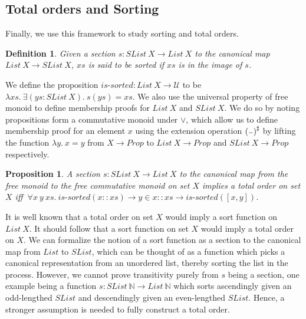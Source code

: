 \documentclass{article}
\begin{document}
\subsection*{Total orders and Sorting}

\newtheorem{myconj}{Conjecture}
\newtheorem{mydef}{Definition}
\newtheorem{mylemma}{Lemma}
\newtheorem{mythm}{Proposition}

Finally, we use this framework to study sorting and total orders.

\begin{mydef}
    Given a section $s : SList \: X \rightarrow List \: X$ to the canonical map $List \: X \rightarrow SList \: X$,
    $xs$ is said to be sorted if $xs$ is in the image of $s$.
\end{mydef}

We define the proposition $\textit{is-sorted} : List \: X \rightarrow \mathcal{U}$ to be
$\lambda xs. \: \exists (ys : SList \: X). \: s(ys) = xs$.
We also use the universal property of free monoid to define membership proofs for $List \: X$ and $SList \: X$.
We do so by noting propositions form a commutative monoid under $\vee$,
which allow us to define membership proof for an element $x$ using the extension operation ${({\scriptstyle{-}})}^{\sharp}$
by lifting the function $\lambda y. \: x = y$ from $X \rightarrow Prop$ to $List \: X \rightarrow Prop$ and $SList \: X \rightarrow Prop$ respectively.

\begin{mythm}
    A section $s : SList \: X \rightarrow List \: X$ to the canonical map from the free monoid to the free commutative monoid on set $X$
    implies a total order on set $X$ iff
    $\: \forall x \: y \: xs. \: \textit{is-sorted}(x :: xs) \rightarrow y \in x :: xs \rightarrow \textit{is-sorted}([x, y])$.
\end{mythm}
It is well known that a total order on set $X$ would imply a sort function on $List \: X$. It should follow that a sort function on set $X$
would imply a total order on $X$. We can formalize the notion of a sort function as a section to the canonical map from $List$ to
$SList$, which can be thought of as a function which picks a canonical representation from an unordered list, thereby sorting
the list in the process. However, we cannot prove transitivity purely from $s$ being a section, one example being
a function $s : SList \: \mathbb{N} \rightarrow List \: \mathbb{N}$ which sorts ascendingly given an odd-lengthed
$SList$ and descendingly given an even-lengthed $SList$. Hence, a stronger assumption is needed to fully construct
a total order.
\end{document}
